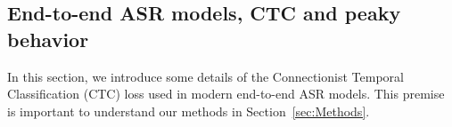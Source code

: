 \subsection{End-to-end ASR models, CTC and peaky behavior}
\label{sec:peaky_behavior}
In this section, we introduce some details of the Connectionist Temporal Classification (CTC) loss used in modern end-to-end ASR models.
This premise is important to understand our methods in Section~\ref{sec:Methods}.


